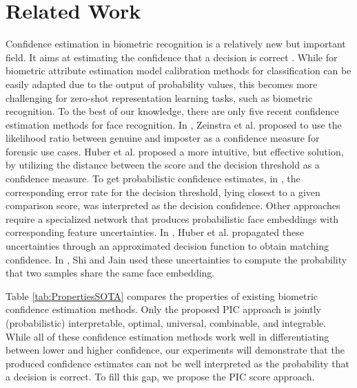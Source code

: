 \documentclass[10pt,twocolumn,letterpaper]{article}
\begin{document}
\section{Related Work}
\label{sec:RelatedWork}


Confidence estimation in biometric recognition is a relatively new but important field.
It aims at estimating the confidence that a decision is correct \cite{DBLP:journals/corr/abs-2210-10354, peterson1988confidence}.
{While for biometric attribute estimation} \cite{DBLP:conf/btas/TerhorstHKZDKK19} model calibration methods for classification \cite{DBLP:conf/icml/GuoPSW17} can be easily adapted due to the output of probability values, this becomes more challenging for zero-shot representation learning tasks, such as biometric recognition.
To the best of our knowledge, there are only five recent confidence estimation methods for face recognition.
In \cite{DBLP:conf/btas/ZeinstraMVS18}, Zeinstra et al. proposed to use the likelihood ratio between genuine and imposter as a confidence measure for forensic use cases.
Huber et al. \cite{DBLP:journals/corr/abs-2210-10354} proposed a more intuitive, but effective solution, by utilizing the distance between the score and the decision threshold as a confidence measure.
To get probabilistic confidence estimates, in \cite{huberICPR22}, the corresponding error rate for the decision threshold, lying closest to a given comparison score, was interpreted as the decision confidence.
Other approaches \cite{DBLP:journals/corr/abs-2210-10354,DBLP:conf/iccv/ShiJ19} require a specialized network that produces probabilistic face embeddings with corresponding feature uncertainties.
In \cite{DBLP:journals/corr/abs-2210-10354}, Huber et al. propagated these uncertainties through an approximated decision function to obtain matching confidence.
In \cite{DBLP:conf/iccv/ShiJ19}, Shi and Jain used these uncertainties to compute the probability that two samples share the same face embedding.


Table \ref{tab:PropertiesSOTA} compares the properties of existing biometric confidence estimation methods.
Only the proposed PIC approach is jointly (probabilistic) interpretable, optimal, universal, combinable, and integrable.
While all of these confidence estimation methods work well in differentiating between lower and higher confidence, our experiments will demonstrate that the produced confidence estimates can not be well interpreted as the probability that a decision is correct.
To fill this gap, we propose the PIC score approach.
\end{document}
